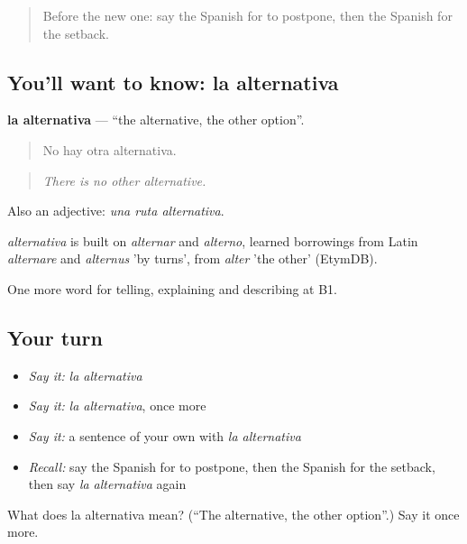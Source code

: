 \label{lesson:ES-C616-alternativa}



\begin{quote}
Before the new one: say the Spanish for to postpone, then the Spanish for the setback.
\end{quote}

\subsection*{You'll want to know: la alternativa}
\textbf{la alternativa} — \textquotedblleft{}the alternative, the other option\textquotedblright{}.

\begin{quote}
No hay otra alternativa.
\end{quote}

\begin{quote}
\emph{There is no other alternative.}
\end{quote}

Also an adjective: \emph{una ruta alternativa}.

\begin{cousinweb}
\emph{alternativa} is built on \emph{alternar} and \emph{alterno}, learned borrowings from Latin \emph{alternare} and \emph{alternus} 'by turns', from \emph{alter} 'the other' (EtymDB).
\end{cousinweb}

\begin{grammarlens}[title={What you've built}]
One more word for telling, explaining and describing at B1.
\end{grammarlens}

\subsection*{Your turn}
\begin{itemize}
\raggedright
  \item \emph{Say it:} \emph{la alternativa}
  \item \emph{Say it:} \emph{la alternativa}, once more
  \item \emph{Say it:} a sentence of your own with \emph{la alternativa}
  \item \emph{Recall:} say the Spanish for to postpone, then the Spanish for the setback, then say \emph{la alternativa} again
\end{itemize}

\begin{tcolorbox}[breakable,colback=teal!4,colframe=teal!35!black,title={Before you move on}]
What does la alternativa mean? (\textquotedblleft{}The alternative, the other option\textquotedblright{}.) Say it once more.
\end{tcolorbox}
